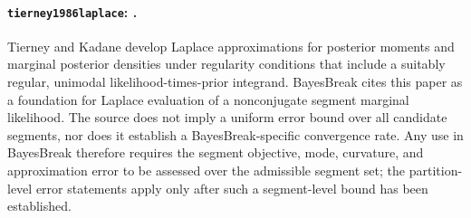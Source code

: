 \paragraph{\texttt{tierney1986laplace}: \citet{tierney1986laplace}.}
Tierney and Kadane develop Laplace approximations for posterior moments and marginal posterior densities under regularity conditions that include a suitably regular, unimodal likelihood-times-prior integrand. BayesBreak cites this paper as a foundation for Laplace evaluation of a nonconjugate segment marginal likelihood. The source does not imply a uniform error bound over all candidate segments, nor does it establish a BayesBreak-specific convergence rate. Any use in BayesBreak therefore requires the segment objective, mode, curvature, and approximation error to be assessed over the admissible segment set; the partition-level error statements apply only after such a segment-level bound has been established.

